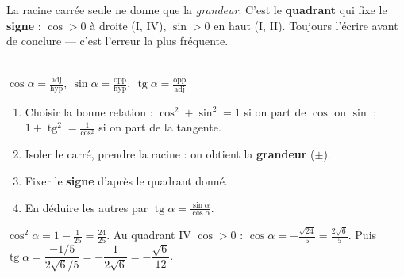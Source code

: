 \documentclass[11pt,a4paper]{article}
\DeclareMathOperator{\tg}{tg}
\begin{document}
\begin{minipage}{0.60\textwidth}
\begin{idee}
La racine carrée seule ne donne que la \emph{grandeur}. C'est le \textbf{quadrant} qui fixe le
\textbf{signe} : $\cos>0$ à droite (I, IV), $\sin>0$ en haut (I, II). Toujours l'écrire avant de
conclure --- c'est l'erreur la plus fréquente.
\end{idee}
\end{minipage}\hfill
\begin{minipage}{0.36\textwidth}
\centering
{}\\[1mm]
{\scriptsize$\cos\alpha=\frac{\text{adj}}{\text{hyp}},\ \sin\alpha=\frac{\text{opp}}{\text{hyp}},\ \tg\alpha=\frac{\text{opp}}{\text{adj}}$}
\end{minipage}

\begin{methode}
\begin{enumerate}[leftmargin=1.6em,topsep=1pt,itemsep=1pt]
  \item Choisir la bonne relation : $\cos^2+\sin^2=1$ si on part de $\cos$ ou $\sin$ ;
        $1+\tg^2=\frac{1}{\cos^2}$ si on part de la tangente.
  \item Isoler le carré, prendre la racine : on obtient la \textbf{grandeur} ($\pm$).
  \item Fixer le \textbf{signe} d'après le quadrant donné.
  \item En déduire les autres par $\tg\alpha=\frac{\sin\alpha}{\cos\alpha}$.
\end{enumerate}
\end{methode}

\begin{exemple}[$\sin\alpha=-\tfrac15$, quadrant IV]
$\cos^2\alpha=1-\frac{1}{25}=\frac{24}{25}$. Au quadrant IV $\cos>0$ :
$\cos\alpha=+\frac{\sqrt{24}}{5}=\frac{2\sqrt6}{5}$. Puis
$\tg\alpha=\dfrac{-1/5}{2\sqrt6/5}=-\dfrac{1}{2\sqrt6}=-\dfrac{\sqrt6}{12}$.
\end{exemple}
\end{document}
